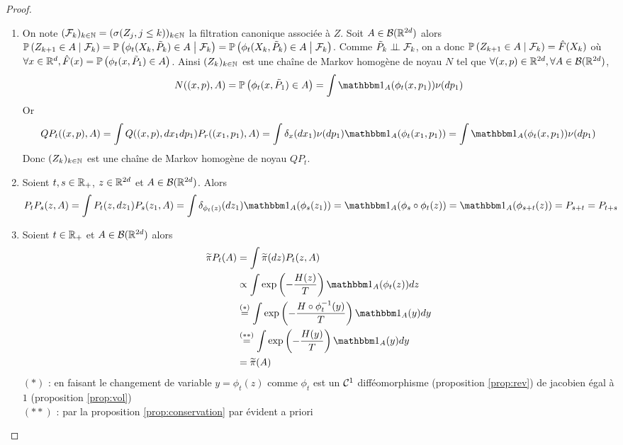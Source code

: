 \documentclass[10pt,a4paper]{article}
\newcommand{\red}{\color{red}}
\begin{document}
\begin{proof}
\begin{enumerate}
\item On note $(\mathcal{F}_k)_{k \in \mathbb{N}} = (\sigma(Z_j, j\leq k))_{k \in \mathbb{N}}$ la filtration canonique associée à $Z$. Soit $A \in \mathcal{B}(\mathbb{R}^{2d})$ alors $\PP[Z_{k+1} \in A \given{\calF_k}] = \PP[\phi_t(X_k, \tilde{P}_k) \in A \given{\calF_k}] = \PP[\phi_t(X_k, \tilde{P}_k) \in A \given{\calF_k}]$. Comme $\tilde{P}_k \perp\!\!\!\perp \mathcal{F}_k$, on a donc $\PP[Z_{k+1} \in A \given{\calF_k}] = \hat{F}(X_k)$ où $\forall x \in \rset^d, \hat{F}(x) = \PP[\phi_t(x, \tilde{P}_1) \in A]$. Ainsi $(Z_k)_{k \in \mathbb{N}}$ est une chaîne de Markov homogène de noyau $N$ tel que $\forall (x,p) \in \mathbb{R}^{2d}, \forall A \in \mathcal{B}(\mathbb{R}^{2d})$,
  $$
  N((x,p), A) = \PP[\phi_t(x, \tilde{P}_1) \in A] = \int \ind_A(\phi_t(x, p_1)) \nu(dp_1)
  $$
  Or
  $$
  Q P_t((x,p),A) = \int Q((x,p), dx_1dp_1) P_r((x_1, p_1), A) = \int \delta_x(dx_1) \nu(dp_1) \ind_A(\phi_t(x_1, p_1)) = \int \ind_A(\phi_t(x,p_1)) \nu(dp_1)
  $$
  Donc $(Z_k)_{k \in \mathbb{N}}$ est une chaîne de Markov homogène de noyau $QP_t$.

\item Soient $t,s \in \mathbb{R}_+$, $z \in \mathbb{R}^{2d}$ et $A \in \mathcal{B}(\mathbb{R}^{2d})$. Alors
  $$
  P_t P_s (z, A) = \int P_t(z, dz_1) P_s(z_1, A) = \int \delta_{\phi_t(z)}(dz_1) \ind_A(\phi_s(z_1)) = \ind_A(\phi_s \circ \phi_t(z)) = \ind_A(\phi_{s+t}(z)) = P_{s+t} = P_{t+s}
  $$

\item Soient $t \in \mathbb{R}_+$ et $A \in \mathcal{B}(\mathbb{R}^{2d})$ alors
  \begin{align*}
    \widetilde{\pi} P_t (A)
    &= \int \widetilde{\pi}(dz) P_t(z, A) \\
    &\propto \int \exp \left(-\frac{H(z)}{T} \right) \ind_A(\phi_t(z)) dz\\
    &\overset{(*)}{=} \int \exp \left(-\frac{H \circ \phi_t^{-1}(y)}{T} \right) \ind_A(y) dy \\
    &\overset{(**)}{=} \int \exp \left(-\frac{H(y)}{T} \right) \ind_A(y) dy \\
    &= \widetilde{\pi}(A)
  \end{align*}
  $(*)$ : en faisant le changement de variable $y = \phi_t(z)$ comme $\phi_t$ est un $\mathcal{C}^1$ difféomorphisme (proposition \ref{prop:rev}) de jacobien égal à $1$ (proposition \ref{prop:vol}) \\
  $(**)$ : par la proposition \ref{prop:conservation} {\red par évident a priori}
\end{enumerate}
\end{proof}
\end{document}
